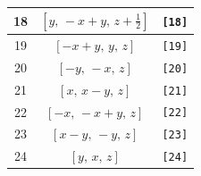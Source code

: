\documentclass[fleqn,8pt]{jsarticle}
\begin{document}
\begin{longtable}{ccc}
18 & $\left[ y,\, - x + y,\, z + \frac{1}{2} \right]$ & {\tt [18]} \\ \hline
19 & $\left[ - x + y,\, y,\, z \right]$ & {\tt [19]} \\ \hline
20 & $\left[ - y,\, - x,\, z \right]$ & {\tt [20]} \\ \hline
21 & $\left[ x,\, x - y,\, z \right]$ & {\tt [21]} \\ \hline
22 & $\left[ - x,\, - x + y,\, z \right]$ & {\tt [22]} \\ \hline
23 & $\left[ x - y,\, - y,\, z \right]$ & {\tt [23]} \\ \hline
24 & $\left[ y,\, x,\, z \right]$ & {\tt [24]} \\
\end{longtable}
\end{document}
